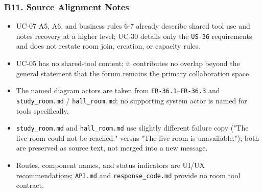 \documentclass[12pt]{article}
\begin{document}
\hypertarget{sec:b11-source-alignment-notes}{}
\subsubsection*{B11. Source Alignment Notes}
\par\medskip

\begin{itemize}
\item UC-07 A5, A6, and business rules 6-7 already describe shared tool use and notes recovery at a higher level; UC-30 details only the \texttt{US-36} requirements and does not restate room join, creation, or capacity rules.
\item UC-05 has no shared-tool content; it contributes no overlap beyond the general statement that the forum remains the primary collaboration space.
\item The named diagram actors are taken from \texttt{FR-36.1}--\texttt{FR-36.3} and \texttt{study\_room.md} / \texttt{hall\_room.md}; no supporting system actor is named for tools specifically.
\item \texttt{study\_room.md} and \texttt{hall\_room.md} use slightly different failure copy ("The live room could not be reached." versus "The live room is unavailable."); both are preserved as source text, not merged into a new message.
\item Routes, component names, and status indicators are UI/UX recommendations; \texttt{API.md} and \texttt{response\_code.md} provide no room tool contract.
\end{itemize}
\par\medskip

\par\medskip
\hypertarget{sec:ui-prototype-specimens}{}
\end{document}
